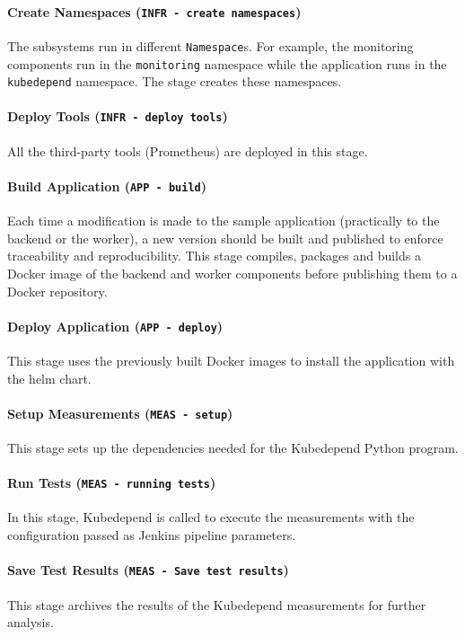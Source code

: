 \paragraph{Create Namespaces (\texttt{INFR - create namespaces})} The subsystems run in different \texttt{Namespace}s. For example, the monitoring components run in the \texttt{monitoring} namespace while the application runs in the \texttt{kubedepend} namespace. The stage creates these namespaces.

\paragraph{Deploy Tools (\texttt{INFR - deploy tools})} All the third-party tools (\eg Prometheus) are deployed in this stage.

\paragraph{Build Application (\texttt{APP - build})} Each time a modification is made to the sample application (practically to the backend or the worker), a new version should be built and published to enforce traceability and reproducibility. This stage compiles, packages and builds a Docker image of the backend and worker components before publishing them to a Docker repository.

\paragraph{Deploy Application (\texttt{APP - deploy})} This stage uses the previously built Docker images to install the application with the helm chart.

\paragraph{Setup Measurements (\texttt{MEAS - setup})} This stage sets up the dependencies needed for the Kubedepend Python program.

\paragraph{Run Tests (\texttt{MEAS - running tests})} In this stage, Kubedepend is called to execute the measurements with the configuration passed as Jenkins pipeline parameters.

\paragraph{Save Test Results (\texttt{MEAS - Save test results})} This stage archives the results of the Kubedepend measurements for further analysis.

